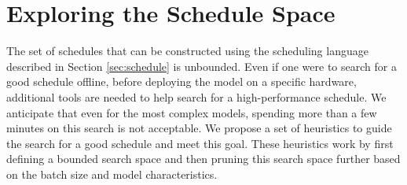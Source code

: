 \section{Exploring the Schedule Space}
\label{sec:exploring}

The set of schedules that can be constructed using the scheduling language described in 
Section \ref{sec:schedule} is unbounded.
Even if one were to search for a good schedule offline, before deploying the model 
on a specific hardware, additional tools are needed to help search for a 
high-performance schedule. We anticipate that even for the most complex models, 
spending more than a few minutes on this search is not acceptable.
We propose a set of heuristics to guide the search for a good schedule 
and meet this goal. These heuristics work by first defining a 
bounded search space and then pruning this search space further
based on the batch size and model characteristics.

